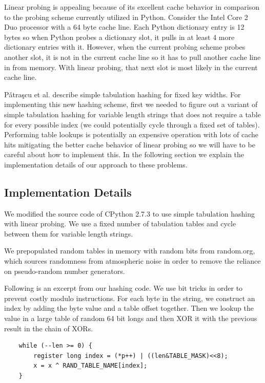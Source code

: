 \documentclass[11pt]{article}
\begin{document}
Linear probing is appealing because of its excellent cache behavior in
comparison to the probing scheme currently utilized in Python.  Consider the
Intel Core 2 Duo processor with a 64 byte cache line.  Each Python dictionary
entry is 12 bytes so when Python probes a dictionary slot, it pulls in at least
4 more dictionary entries with it.  However, when the current probing scheme
probes another slot, it is not in the current cache line so it has to pull
another cache line in from memory.  With linear probing, that next slot is most likely in the current cache line.

P\v{a}tra\c{s}cu et al. \cite{mihai} describe simple tabulation hashing for fixed key widths.  For implementing this new hashing scheme, first we needed to figure out a variant of simple tabulation hashing for variable length strings that does not require a table for every possible index (we could potentially cycle through a fixed set of tables).  Performing table lookups is potentially an expensive operation with lots of cache hits mitigating the better cache behavior of linear probing so we will have to be careful about how to implement this. In the following section we explain the implementation details of our approach to these problems.

\subsection{Implementation Details}
We modified the source code of CPython 2.7.3 to use simple tabulation hashing
with linear probing.  We use a fixed number of tabulation tables and cycle between them
for variable length strings.

We prepopulated random tables in memory with random bits from random.org, which
sources randomness from atmospheric noise in order to remove the reliance on
pseudo-random number generators.
      

      Following is an excerpt from our hashing code.  We use bit tricks in
      order to prevent costly modulo instructions.  For each byte in the
      string, we construct an index by adding the byte value and a table offset
      together.  Then we lookup the value in a large table of random 64 bit
      longs and then XOR it with the previous result in the chain of XORs.

       \begin{verbatim}
    while (--len >= 0) {
        register long index = (*p++) | ((len&TABLE_MASK)<<8);
        x = x ^ RAND_TABLE_NAME[index];
    }
       \end{verbatim}
\end{document}
